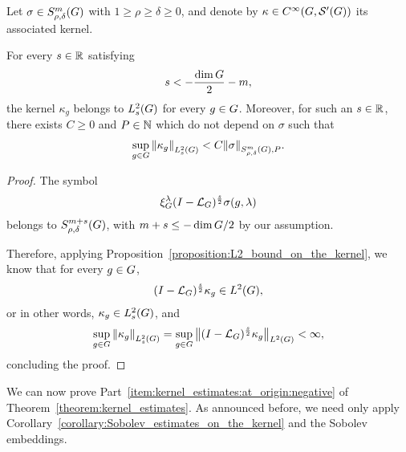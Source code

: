 \begin{corollary}
\label{corollary:Sobolev_estimates_on_the_kernel}
    Let $\sigma \in \SymbolClass m {\rho,\delta}$ with $1 \geq \rho \geq \delta \geq 0$,
    and denote by $\kappa \in \SmoothFunctions {\Group, \TemperedDistributions \Group}$ its associated kernel.

    For every $s \in \R$ satisfying
    \begin{align*}
        s < -\frac{\dim \Group} 2 - m,
    \end{align*}
    the kernel $\kappa_g$ belongs to $\Sobolev s$ for every $g \in \Group$.
    Moreover, for such an $s \in \R$, there exists $C \geq 0$ and $P \in \N$ which do not depend on $\sigma$ such that
    \begin{align*}
        \sup_{g \in \Group} \norm [\Sobolev s] {\kappa_g} < C \SymbolSemiNorm m {\rho, \delta} P \sigma.
    \end{align*}
\end{corollary}
\begin{proof}
    The symbol
    \begin{align*}
        \Rep \lambda \BesselPotential s \sigma(g, \lambda)
    \end{align*}
    belongs to $\SymbolClass {m + s} {\rho, \delta}$,
    with $m + s \leq -\dim \Group/2$ by our assumption.

    Therefore, applying Proposition~\ref{proposition:L2_bound_on_the_kernel},
    we know that for every $g \in \Group$,
    \begin{align*}
        \BesselPotential s \kappa_g \in \Lebesgue 2 \Group,
    \end{align*}
    or in other words, $\kappa_g \in \Sobolev s$, and
    \begin{align*}
        \sup_{g \in \Group} \norm [\Sobolev s] {\kappa_g}
        = \sup_{g \in \Group} \norm [\Lebesgue 2 \Group] {\BesselPotential s \kappa_g}
        < \infty,
    \end{align*}
    concluding the proof.
\end{proof}

We can now prove Part~\ref{item:kernel_estimates:at_origin:negative} of Theorem~\ref{theorem:kernel_estimates}.
As announced before,
we need only apply Corollary~\ref{corollary:Sobolev_estimates_on_the_kernel} and the Sobolev embeddings.

